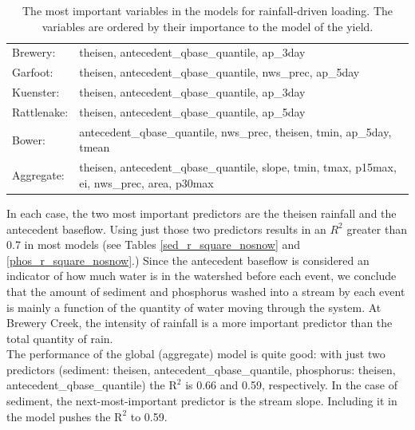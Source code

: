 \documentclass[10pt]{article}
\begin{document}
\begin{table}[h!]
\begin{center}
\begin{tabular}{ll}
        \hspace{5mm} Brewery: & theisen, antecedent\_qbase\_quantile, ap\_3day\\
        \hspace{5mm} Garfoot: & theisen, antecedent\_qbase\_quantile, nws\_prec, ap\_5day\\
        \hspace{5mm} Kuenster: & theisen, antecedent\_qbase\_quantile, ap\_3day\\
        \hspace{5mm} Rattlenake: & theisen, antecedent\_qbase\_quantile, ap\_5day\\
        \hspace{5mm} Bower: & antecedent\_qbase\_quantile, nws\_prec, theisen, tmin, ap\_5day, tmean\\
        \hspace{5mm} Aggregate: & theisen, antecedent\_qbase\_quantile, slope, tmin, tmax, p15max, ei, nws\_prec, area, p30max\\
    \end{tabular}
    \caption{The most important variables in the models for rainfall-driven loading. The variables are ordered by their importance to the model of the yield. \label{nosnow_predictor_list}}
    \end{center}
\end{table}

In each case, the two most important predictors are the theisen rainfall and the antecedent baseflow. Using just those two predictors results in an $R^2$ greater than 0.7 in most models (see Tables \ref{sed_r_square_nosnow} and \ref{phos_r_square_nosnow}.) Since the antecedent baseflow is considered an indicator of how much water is in the watershed before each event, we conclude that the amount of sediment and phosphorus washed into a stream by each event is mainly a function of the quantity of water moving through the system. At Brewery Creek, the intensity of rainfall is a more important predictor than the total quantity of rain.\\

The performance of the global (aggregate) model is quite good: with just two predictors (sediment: theisen, antecedent\_qbase\_quantile, phosphorus: theisen, antecedent\_qbase\_quantile) the $\text{R}^2$ is 0.66 and 0.59, respectively. In the case of sediment, the next-most-important predictor is the stream slope. Including it in the model pushes the $\text{R}^2$ to 0.59.\\
\end{document}
